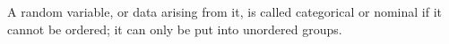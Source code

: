 A random variable, or data arising from it, is called categorical or
nominal if it cannot be ordered; it can only be put into unordered groups.
